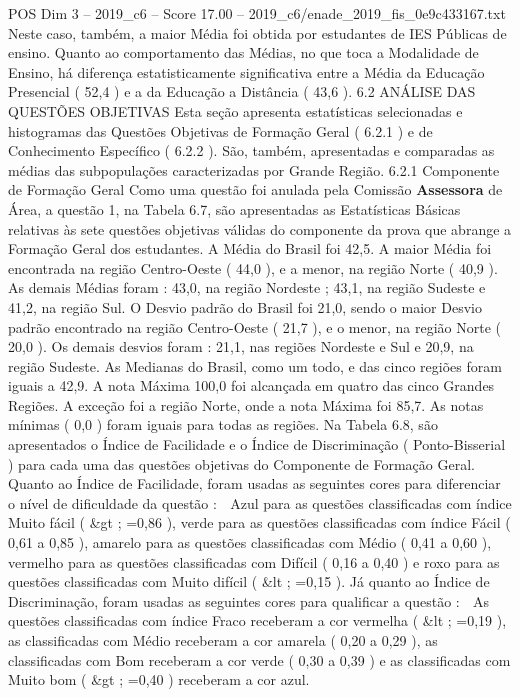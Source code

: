 \begin{textsample}{POS Dim 3 – 2019\_c6 – Score 17.00 – 2019\_c6/enade\_2019\_fis\_0e9c433167.txt}
Neste caso, também, a maior Média foi obtida por estudantes de IES Públicas de ensino.
Quanto ao comportamento das Médias, no que toca a Modalidade de Ensino, há diferença estatisticamente significativa entre a Média da Educação Presencial ( 52,4 ) e a da Educação a Distância ( 43,6 ). 6.2 ANÁLISE DAS QUESTÕES OBJETIVAS Esta seção apresenta estatísticas selecionadas e histogramas das Questões Objetivas de Formação Geral ( 6.2.1 ) e de Conhecimento Específico ( 6.2.2 ).
São, também, apresentadas e comparadas as médias das subpopulações caracterizadas por Grande Região. 6.2.1 Componente de Formação Geral Como uma questão foi anulada pela Comissão \textbf{Assessora} de Área, a questão 1, na Tabela 6.7, são apresentadas as Estatísticas Básicas relativas às sete questões objetivas válidas do componente da prova que abrange a Formação Geral dos estudantes.
A Média do Brasil foi 42,5.
A maior Média foi encontrada na região Centro-Oeste ( 44,0 ), e a menor, na região Norte ( 40,9 ).
As demais Médias foram : 43,0, na região Nordeste ; 43,1, na região Sudeste e 41,2, na região Sul.
O Desvio padrão do Brasil foi 21,0, sendo o maior Desvio padrão encontrado na região Centro-Oeste ( 21,7 ), e o menor, na região Norte ( 20,0 ).
Os demais desvios foram : 21,1, nas regiões Nordeste e Sul e 20,9, na região Sudeste.
As Medianas do Brasil, como um todo, e das cinco regiões foram iguais a 42,9.
A nota Máxima 100,0 foi alcançada em quatro das cinco Grandes Regiões.
A exceção foi a região Norte, onde a nota Máxima foi 85,7.
As notas mínimas ( 0,0 ) foram iguais para todas as regiões.
Na Tabela 6.8, são apresentados o Índice de Facilidade e o Índice de Discriminação ( Ponto-Bisserial ) para cada uma das questões objetivas do Componente de Formação Geral.
Quanto ao Índice de Facilidade, foram usadas as seguintes cores para diferenciar o nível de dificuldade da questão :  Azul para as questões classificadas com índice Muito fácil ( \&gt ; =0,86 ), verde para as questões classificadas com índice Fácil ( 0,61 a 0,85 ), amarelo para as questões classificadas com Médio ( 0,41 a 0,60 ), vermelho para as questões classificadas com Difícil ( 0,16 a 0,40 ) e roxo para as questões classificadas com Muito difícil ( \&lt ; =0,15 ).
Já quanto ao Índice de Discriminação, foram usadas as seguintes cores para qualificar a questão :  As questões classificadas com índice Fraco receberam a cor vermelha ( \&lt ; =0,19 ), as classificadas com Médio receberam a cor amarela ( 0,20 a 0,29 ), as classificadas com Bom receberam a cor verde ( 0,30 a 0,39 ) e as classificadas com Muito bom ( \&gt ; =0,40 ) receberam a cor azul.

\end{textsample}
